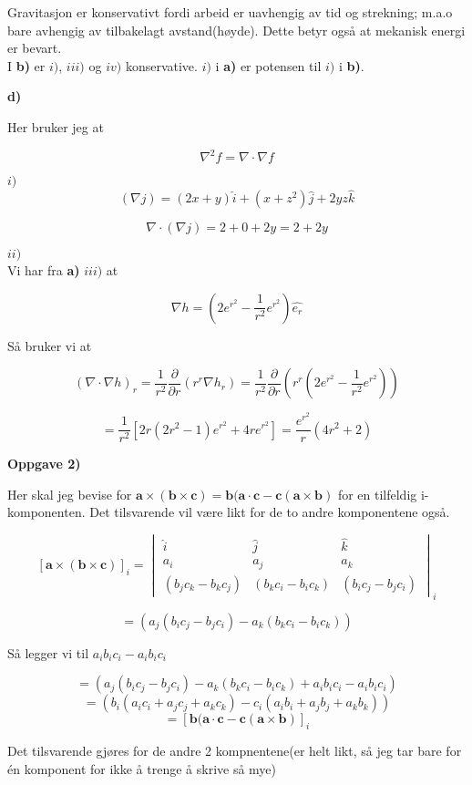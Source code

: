 \documentclass[a4paper,norsk,11pt,twoside]{article}
\begin{document}
Gravitasjon er konservativt fordi arbeid er uavhengig av tid og strekning; m.a.o bare avhengig av tilbakelagt avstand(høyde). Dette betyr også at mekanisk energi er bevart.\\

I \textbf{b)} er $i)$, $iii)$ og $iv)$ konservative. $i)$ i \textbf{a)} er potensen til $i)$ i \textbf{b)}.

\textbf{d)}

Her bruker jeg at

\begin{equation}
\nabla ^{2}f = \nabla \cdot \nabla f 
\end{equation}

$i)$\\

$$
(\nabla j) = (2x + y)\hat{i} + (x + z^2)\hat{j} + 2yz\hat{k}
$$

$$
\nabla \cdot(\nabla j) = 2 + 0 + 2y = 2 + 2y
$$

$ii)$\\

Vi har fra \textbf{a)} $iii)$ at

$$
\nabla h = (2e^{r^{2}} - \frac{1}{r^{2}}e^{r^{2}})\hat{e_r}
$$

Så bruker vi at

$$
(\nabla \cdot \nabla h)_r = \frac{1}{r^{2}}\frac{\partial}{\partial r}(r^{r} \nabla h_r) = \frac{1}{r^{2}}\frac{\partial}{\partial r}(r^{r} (2e^{r^{2}} - \frac{1}{r^{2}}e^{r^{2}}))
$$

$$
= \frac{1}{r^{2}}[2r(2r^{2} - 1)e^{r^{2}} + 4re^{r^{2}}] = \frac{e^{r^{2}}}{r}(4r^{2} + 2)
$$


\textbf{Oppgave 2)}

Her skal jeg bevise for $\textbf{a} \times (\textbf{b} \times \textbf{c} ) = \textbf{b}(\textbf{a} \cdot \textbf{c} - \textbf{c}(\textbf{a} \times \textbf{b}) $ for en tilfeldig i-komponenten. Det tilsvarende vil være likt for de to andre komponentene også.

$$
[\textbf{a} \times (\textbf{b} \times \textbf{c} )]_i 
=\begin{vmatrix}
\hat i & \hat j & \hat k \\
{a_i} & {a_j} & {a_k} \\
(b_j c_k - b_k c_j) & (b_k c_i - b_i c_k) & (b_i c_j - b_j c_i)
\end{vmatrix} _i
$$

$$
= (a_j(b_i c_j - b_j c_i) - a_k(b_k c_i - b_i c_k))
$$

Så legger vi til $a_ib_ic_i - a_ib_ic_i $

$$
= (a_j(b_i c_j - b_j c_i) - a_k(b_k c_i - b_i c_k) + a_ib_ic_i - a_ib_ic_i)
$$
$$
= (b_i(a_ic_i +a_jc_j + a_kc_k) - c_i(a_ib_i + a_jb_j + a_kb_k))
$$
$$
= [\textbf{b}(\textbf{a} \cdot \textbf{c} - \textbf{c}(\textbf{a} \times \textbf{b})]_i
$$

Det tilsvarende gjøres for de andre 2 kompnentene(er helt likt, så jeg tar bare for én komponent for ikke å trenge å skrive så mye)
\end{document}
